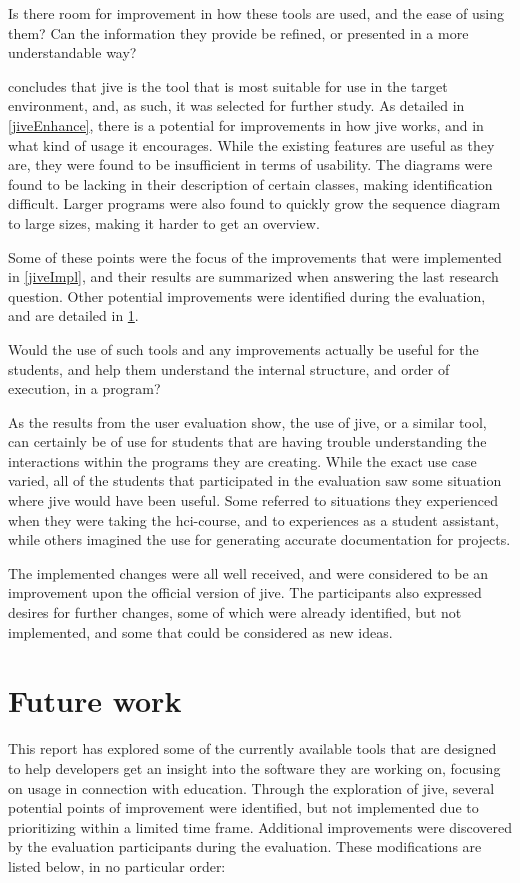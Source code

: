 \begin{theorem}
Is there room for improvement in how these tools are used, and the ease of using them? Can the information they provide be refined, or presented in a more understandable way?
\end{theorem}
 concludes that \gls{jive} is the tool that is most suitable for use in the target environment, and, as such, it was selected for further study.
As detailed in \cref{jiveEnhance}, there is a potential for improvements in how \gls{jive} works, and in what kind of usage it encourages.
While the existing features are useful as they are, they were found to be insufficient in terms of usability.
The diagrams were found to be lacking in their description of certain classes, making identification difficult.
Larger programs were also found to quickly grow the sequence diagram to large sizes, making it harder to get an overview.


Some of these points were the focus of the improvements that were implemented in \cref{jiveImpl}, and their results are summarized when answering the last research question.
Other potential improvements were identified during the evaluation, and are detailed in \cref{conclusionFuture}.


\begin{theorem}
Would the use of such tools and any improvements actually be useful for the students, and help them understand the internal structure, and order of execution, in a program?
\end{theorem}
As the results from the user evaluation show, the use of \gls{jive}, or a similar tool, can certainly be of use for students that are having trouble understanding the interactions within the programs they are creating.
While the exact use case varied, all of the students that participated in the evaluation saw some situation where \gls{jive} would have been useful.
Some referred to situations they experienced when they were taking the \gls{hci}-course, and to experiences as a student assistant, while others imagined the use for generating accurate documentation for projects.


The implemented changes were all well received, and were considered to be an improvement upon the official version of \gls{jive}.
The participants also expressed desires for further changes, some of which were already identified, but not implemented, and some that could be considered as new ideas.


\section{Future work}\label{conclusionFuture}
This report has explored some of the currently available tools that are designed to help developers get an insight into the software they are working on, focusing on usage in connection with education.
Through the exploration of \gls{jive}, several potential points of improvement were identified, but not implemented due to prioritizing within a limited time frame.
Additional improvements were discovered by the evaluation participants during the evaluation.
These modifications are listed below, in no particular order:

